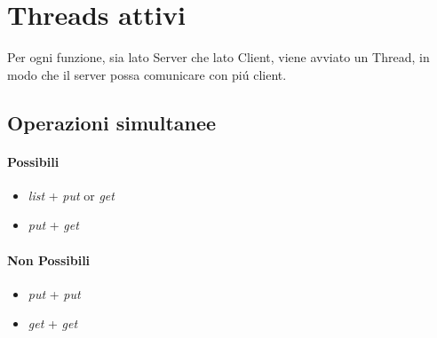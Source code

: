 \documentclass[a4paper, 12pt]{report}
\begin{document}
\chapter{Threads attivi}
Per ogni funzione, sia lato Server che lato Client, viene avviato un Thread, in modo che il server possa comunicare
con piú client.

\section{Operazioni simultanee}
\subsubsection{Possibili}
\begin{itemize}
    \item \emph{list} + \emph{put} or \emph{get}
    \item \emph{put} + \emph{get}
\end{itemize}

\subsubsection{Non Possibili}
\begin{itemize}
    \item \emph{put} + \emph{put}
    \item \emph{get} + \emph{get}
\end{itemize}
\end{document}
